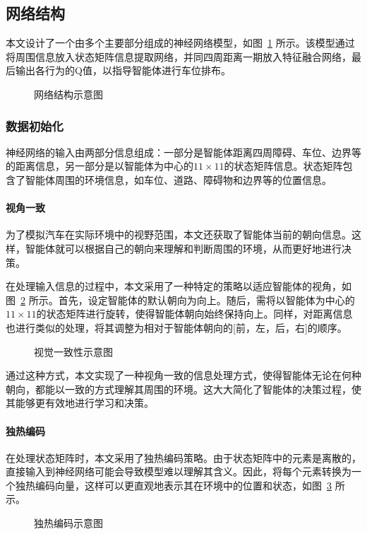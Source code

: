 \subsection{网络结构}
本文设计了一个由多个主要部分组成的神经网络模型，如图~\ref{fig:network} 所示。该模型通过将周围信息放入状态矩阵信息提取网络，并同四周距离一期放入特征融合网络，最后输出各行为的Q值，以指导智能体进行车位排布。
\begin{figure}[!htb]
    \centering
    
    \caption{网络结构示意图}
    \label{fig:network}
\end{figure}
\subsubsection{数据初始化}
神经网络的输入由两部分信息组成：一部分是智能体距离四周障碍、车位、边界等的距离信息，另一部分是以智能体为中心的$11\times 11$的状态矩阵信息。状态矩阵包含了智能体周围的环境信息，如车位、道路、障碍物和边界等的位置信息。
\paragraph{视角一致}
为了模拟汽车在实际环境中的视野范围，本文还获取了智能体当前的朝向信息。这样，智能体就可以根据自己的朝向来理解和判断周围的环境，从而更好地进行决策。

在处理输入信息的过程中，本文采用了一种特定的策略以适应智能体的视角，如图~\ref{fig:consistent_perspective} 所示。首先，设定智能体的默认朝向为向上。随后，需将以智能体为中心的$11\times 11$的状态矩阵进行旋转，使得智能体朝向始终保持向上。同样，对距离信息也进行类似的处理，将其调整为相对于智能体朝向的[前，左，后，右]的顺序。
\begin{figure}[!htb]
    \centering
    
    \caption{视觉一致性示意图}
    \label{fig:consistent_perspective}
\end{figure}

通过这种方式，本文实现了一种视角一致的信息处理方式，使得智能体无论在何种朝向，都能以一致的方式理解其周围的环境。这大大简化了智能体的决策过程，使其能够更有效地进行学习和决策。
\paragraph{独热编码}
在处理状态矩阵时，本文采用了独热编码策略。由于状态矩阵中的元素是离散的，直接输入到神经网络可能会导致模型难以理解其含义。因此，将每个元素转换为一个独热编码向量，这样可以更直观地表示其在环境中的位置和状态，如图~\ref{fig:one_hot} 所示。
\begin{figure}[!htb]
    \centering
    
    \caption{独热编码示意图}
    \label{fig:one_hot}
\end{figure}


